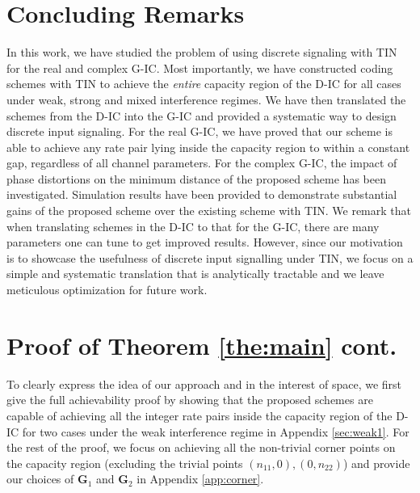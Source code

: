 \documentclass[12pt, draftclsnofoot, onecolumn]{IEEEtran}
\theoremstyle{definition}
\begin{document}

\section{Concluding Remarks}\label{sec:conclude}
In this work, we have studied the problem of using discrete signaling with TIN for the real and complex G-IC. Most importantly, we have constructed coding schemes with TIN to achieve the \emph{entire} capacity region of the D-IC for all cases under weak, strong and mixed interference regimes. We have then translated the schemes from the D-IC into the G-IC and provided a systematic way to design discrete input signaling. %
For the real G-IC, we have proved that our scheme is able to achieve any rate pair lying inside the capacity region to within a constant gap, regardless of all channel parameters. For the complex G-IC, the impact of phase distortions on the minimum distance of the proposed scheme has been investigated. Simulation results have been provided to demonstrate substantial gains of the proposed scheme over the existing scheme with TIN. We remark that when translating schemes in the D-IC to that for the G-IC, there are many parameters one can tune to get improved results. However, since our motivation is to showcase the usefulness of discrete input signalling under TIN, we focus on a simple and systematic translation that is analytically tractable and we leave meticulous optimization for future work.


\appendices


\section{Proof of Theorem \ref{the:main} cont.}\label{app:proof}
To clearly express the idea of our approach and in the interest of space, we first give the full achievability proof by showing that the proposed schemes are capable of achieving all the integer rate pairs inside the capacity region of the D-IC for two cases under the weak interference regime in Appendix \ref{sec:weak1}. For the rest of the proof, we focus on achieving all the non-trivial corner points on the capacity region (excluding the trivial points $(n_{11},0),(0,n_{22})$) and provide our choices of $\mathbf{G}_1$ and $\mathbf{G}_2$ in Appendix \ref{app:corner}.
\end{document}
